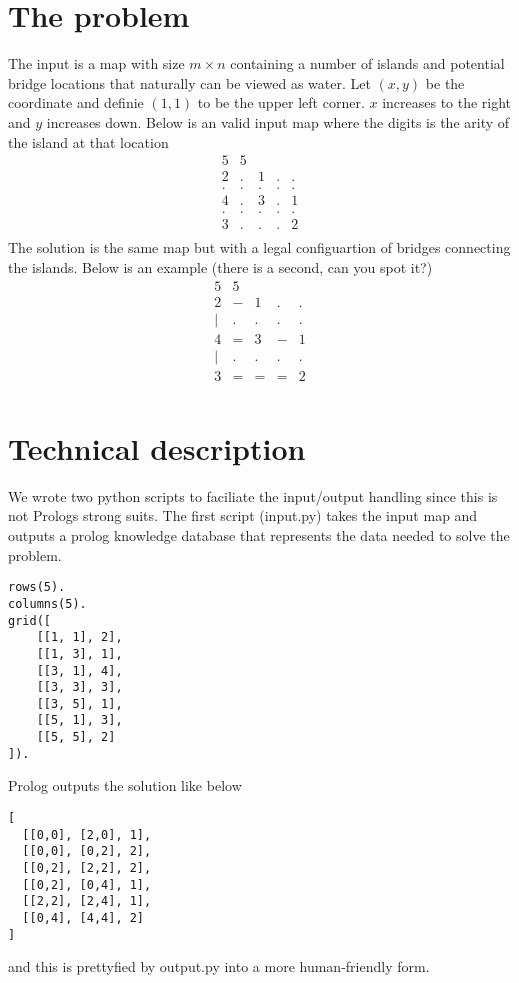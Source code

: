 \documentclass[a4paper,12pt]{article}
\begin{document}
\section*{The problem}
The input is a map with size $m \times n$ containing a number of islands and potential bridge locations that naturally can be viewed as water. Let $(x,y)$ be the coordinate and definie $(1,1)$ to be the upper left corner. $x$ increases to the right and $y$ increases down. Below is an valid input map where the digits is the arity of the island at that location
\[
    \begin{array}{lllll}
    5 & 5 \\
    2 & . & 1 & . & . \\
    . & . & . & . & . \\
    4 & . & 3 & . & 1 \\
    . & . & . & . & . \\
    3 & . & . & . & 2 \\
    \end{array}
\]
The solution is the same map but with a legal configuartion of bridges connecting the islands. Below is an example (there is a second, can you spot it?)
\[
    \begin{array}{lllll}
    5 & 5 \\
    2 & - & 1 & . & . \\
    | & . & . & . & . \\
    4 & = & 3 & - & 1 \\
    | & . & . & . & . \\
    3 & = & = & = & 2 \\
    \end{array}
\]

\section*{Technical description}
We wrote two python scripts to faciliate the input/output handling since this is not Prologs strong suits. The first script (input.py) takes the input map and outputs a prolog knowledge database that represents the data needed to solve the problem.
\begin{verbatim}
rows(5).
columns(5).
grid([
    [[1, 1], 2],
    [[1, 3], 1],
    [[3, 1], 4],
    [[3, 3], 3],
    [[3, 5], 1],
    [[5, 1], 3],
    [[5, 5], 2]
]).
\end{verbatim}
Prolog outputs the solution like below
\begin{verbatim}
[
  [[0,0], [2,0], 1],
  [[0,0], [0,2], 2],
  [[0,2], [2,2], 2],
  [[0,2], [0,4], 1],
  [[2,2], [2,4], 1],
  [[0,4], [4,4], 2]
]
\end{verbatim}
and this is prettyfied by output.py into a more human-friendly form.
\end{document}
